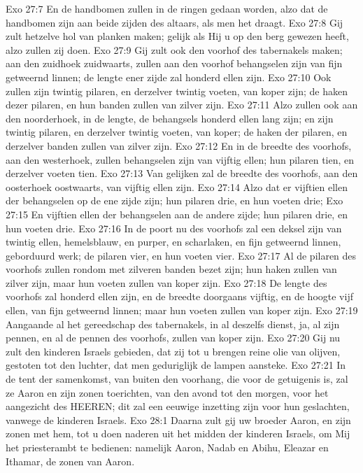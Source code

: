 Exo 27:7  En de handbomen zullen in de ringen gedaan worden, alzo dat de handbomen zijn aan beide zijden des altaars, als men het draagt.
Exo 27:8  Gij zult hetzelve hol van planken maken; gelijk als Hij u op den berg gewezen heeft, alzo zullen zij doen.
Exo 27:9  Gij zult ook den voorhof des tabernakels maken; aan den zuidhoek zuidwaarts, zullen aan den voorhof behangselen zijn van fijn getweernd linnen; de lengte ener zijde zal honderd ellen zijn.
Exo 27:10  Ook zullen zijn twintig pilaren, en derzelver twintig voeten, van koper zijn; de haken dezer pilaren, en hun banden zullen van zilver zijn.
Exo 27:11  Alzo zullen ook aan den noorderhoek, in de lengte, de behangsels honderd ellen lang zijn; en zijn twintig pilaren, en derzelver twintig voeten, van koper; de haken der pilaren, en derzelver banden zullen van zilver zijn.
Exo 27:12  En in de breedte des voorhofs, aan den westerhoek, zullen behangselen zijn van vijftig ellen; hun pilaren tien, en derzelver voeten tien.
Exo 27:13  Van gelijken zal de breedte des voorhofs, aan den oosterhoek oostwaarts, van vijftig ellen zijn.
Exo 27:14  Alzo dat er vijftien ellen der behangselen op de ene zijde zijn; hun pilaren drie, en hun voeten drie;
Exo 27:15  En vijftien ellen der behangselen aan de andere zijde; hun pilaren drie, en hun voeten drie.
Exo 27:16  In de poort nu des voorhofs zal een deksel zijn van twintig ellen, hemelsblauw, en purper, en scharlaken, en fijn getweernd linnen, geborduurd werk; de pilaren vier, en hun voeten vier.
Exo 27:17  Al de pilaren des voorhofs zullen rondom met zilveren banden bezet zijn; hun haken zullen van zilver zijn, maar hun voeten zullen van koper zijn.
Exo 27:18  De lengte des voorhofs zal honderd ellen zijn, en de breedte doorgaans vijftig, en de hoogte vijf ellen, van fijn getweernd linnen; maar hun voeten zullen van koper zijn.
Exo 27:19  Aangaande al het gereedschap des tabernakels, in al deszelfs dienst, ja, al zijn pennen, en al de pennen des voorhofs, zullen van koper zijn.
Exo 27:20  Gij nu zult den kinderen Israels gebieden, dat zij tot u brengen reine olie van olijven, gestoten tot den luchter, dat men geduriglijk de lampen aansteke.
Exo 27:21  In de tent der samenkomst, van buiten den voorhang, die voor de getuigenis is, zal ze Aaron en zijn zonen toerichten, van den avond tot den morgen, voor het aangezicht des HEEREN; dit zal een eeuwige inzetting zijn voor hun geslachten, vanwege de kinderen Israels.
Exo 28:1  Daarna zult gij uw broeder Aaron, en zijn zonen met hem, tot u doen naderen uit het midden der kinderen Israels, om Mij het priesterambt te bedienen: namelijk Aaron, Nadab en Abihu, Eleazar en Ithamar, de zonen van Aaron.

